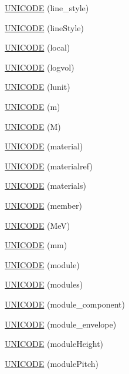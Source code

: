 \begin{DoxyCompactItemize}
\hyperlink{namespace_d_d4hep_1_1_x_m_l_a32753339e1cbde9854bcfb845e8ed848}{UNICODE} (line\_\-style)
\item 
\hyperlink{namespace_d_d4hep_1_1_x_m_l_a36f75e7bc006577fd1ea6ae47513dbef}{UNICODE} (lineStyle)
\item 
\hyperlink{namespace_d_d4hep_1_1_x_m_l_a5c67b47b6c902e66481f508fd64fbc72}{UNICODE} (local)
\item 
\hyperlink{namespace_d_d4hep_1_1_x_m_l_a06296210df0a27ee6158ff1c347231d9}{UNICODE} (logvol)
\item 
\hyperlink{namespace_d_d4hep_1_1_x_m_l_aef4bcbeba11c77315e897b3190c50738}{UNICODE} (lunit)
\item 
\hyperlink{namespace_d_d4hep_1_1_x_m_l_adb83c4522f0c4de8816c6d306a4caf2e}{UNICODE} (m)
\item 
\hyperlink{namespace_d_d4hep_1_1_x_m_l_a464cfc2460dcdcc1f7c2d5c1ee80775d}{UNICODE} (M)
\item 
\hyperlink{namespace_d_d4hep_1_1_x_m_l_a5357e2344aa4974c1ace5a41c7085393}{UNICODE} (material)
\item 
\hyperlink{namespace_d_d4hep_1_1_x_m_l_a7a9b31a06ebd35e5b180e0504a5e6730}{UNICODE} (materialref)
\item 
\hyperlink{namespace_d_d4hep_1_1_x_m_l_aeb8d384f5d46849af621f4928882a8d8}{UNICODE} (materials)
\item 
\hyperlink{namespace_d_d4hep_1_1_x_m_l_aa1b4759313fd98a9733d5f5b9b197f65}{UNICODE} (member)
\item 
\hyperlink{namespace_d_d4hep_1_1_x_m_l_a33af19b502f0cb2fc0edc3aff0058c5a}{UNICODE} (MeV)
\item 
\hyperlink{namespace_d_d4hep_1_1_x_m_l_a0ebbfa81b0637122ebe8a95c75ad8dca}{UNICODE} (mm)
\item 
\hyperlink{namespace_d_d4hep_1_1_x_m_l_a93c8cbfeffaed013e345e6fe45106a7c}{UNICODE} (module)
\item 
\hyperlink{namespace_d_d4hep_1_1_x_m_l_aa8467fc611f341ca8e61ad197414c986}{UNICODE} (modules)
\item 
\hyperlink{namespace_d_d4hep_1_1_x_m_l_a369200919680954eee237afd8c25556e}{UNICODE} (module\_\-component)
\item 
\hyperlink{namespace_d_d4hep_1_1_x_m_l_aa50cd77c10950a1ec1948ece8a837fa7}{UNICODE} (module\_\-envelope)
\item 
\hyperlink{namespace_d_d4hep_1_1_x_m_l_a60cd41b01ef952ecf409bd435f9d73fc}{UNICODE} (moduleHeight)
\item 
\hyperlink{namespace_d_d4hep_1_1_x_m_l_ada6a75e6c0c54ecd53340fa1ddd1a32f}{UNICODE} (modulePitch)

\end{DoxyCompactItemize}
